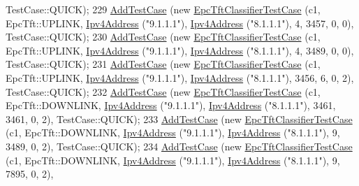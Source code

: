 \begin{DoxyCode}
      TestCase::QUICK);
229   \hyperlink{classns3_1_1TestCase_a3718088e3eefd5d6454569d2e0ddd835}{AddTestCase} (\textcolor{keyword}{new} \hyperlink{classEpcTftClassifierTestCase}{EpcTftClassifierTestCase} (c1, EpcTft::UPLINK,   
      \hyperlink{classns3_1_1Ipv4Address}{Ipv4Address} (\textcolor{stringliteral}{"9.1.1.1"}), \hyperlink{classns3_1_1Ipv4Address}{Ipv4Address} (\textcolor{stringliteral}{"8.1.1.1"}),     4,     3457,     0,    0), 
      TestCase::QUICK);
230   \hyperlink{classns3_1_1TestCase_a3718088e3eefd5d6454569d2e0ddd835}{AddTestCase} (\textcolor{keyword}{new} \hyperlink{classEpcTftClassifierTestCase}{EpcTftClassifierTestCase} (c1, EpcTft::UPLINK,   
      \hyperlink{classns3_1_1Ipv4Address}{Ipv4Address} (\textcolor{stringliteral}{"9.1.1.1"}), \hyperlink{classns3_1_1Ipv4Address}{Ipv4Address} (\textcolor{stringliteral}{"8.1.1.1"}),     4,     3489,     0,    0), 
      TestCase::QUICK);
231   \hyperlink{classns3_1_1TestCase_a3718088e3eefd5d6454569d2e0ddd835}{AddTestCase} (\textcolor{keyword}{new} \hyperlink{classEpcTftClassifierTestCase}{EpcTftClassifierTestCase} (c1, EpcTft::UPLINK,   
      \hyperlink{classns3_1_1Ipv4Address}{Ipv4Address} (\textcolor{stringliteral}{"9.1.1.1"}), \hyperlink{classns3_1_1Ipv4Address}{Ipv4Address} (\textcolor{stringliteral}{"8.1.1.1"}),  3456,        6,     0,    2), 
      TestCase::QUICK);
232   \hyperlink{classns3_1_1TestCase_a3718088e3eefd5d6454569d2e0ddd835}{AddTestCase} (\textcolor{keyword}{new} \hyperlink{classEpcTftClassifierTestCase}{EpcTftClassifierTestCase} (c1, EpcTft::DOWNLINK, 
      \hyperlink{classns3_1_1Ipv4Address}{Ipv4Address} (\textcolor{stringliteral}{"9.1.1.1"}), \hyperlink{classns3_1_1Ipv4Address}{Ipv4Address} (\textcolor{stringliteral}{"8.1.1.1"}),  3461,     3461,     0,    2), 
      TestCase::QUICK);
233   \hyperlink{classns3_1_1TestCase_a3718088e3eefd5d6454569d2e0ddd835}{AddTestCase} (\textcolor{keyword}{new} \hyperlink{classEpcTftClassifierTestCase}{EpcTftClassifierTestCase} (c1, EpcTft::DOWNLINK, 
      \hyperlink{classns3_1_1Ipv4Address}{Ipv4Address} (\textcolor{stringliteral}{"9.1.1.1"}), \hyperlink{classns3_1_1Ipv4Address}{Ipv4Address} (\textcolor{stringliteral}{"8.1.1.1"}),     9,     3489,     0,    2), 
      TestCase::QUICK);
234   \hyperlink{classns3_1_1TestCase_a3718088e3eefd5d6454569d2e0ddd835}{AddTestCase} (\textcolor{keyword}{new} \hyperlink{classEpcTftClassifierTestCase}{EpcTftClassifierTestCase} (c1, EpcTft::DOWNLINK, 
      \hyperlink{classns3_1_1Ipv4Address}{Ipv4Address} (\textcolor{stringliteral}{"9.1.1.1"}), \hyperlink{classns3_1_1Ipv4Address}{Ipv4Address} (\textcolor{stringliteral}{"8.1.1.1"}),     9,     7895,     0,    2), 

\end{DoxyCode}
